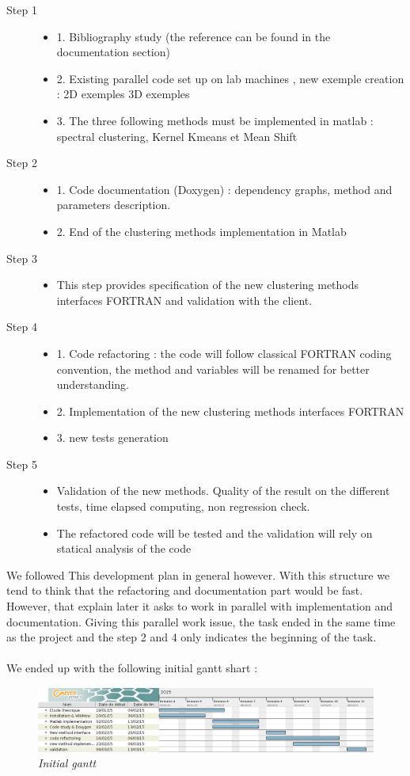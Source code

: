 \begin{description}
\item[Step 1]
	\begin{itemize}
	\item 1. Bibliography study (the reference can be found in the documentation section)
 	\item 2. Existing parallel code set up on lab machines , new exemple creation : 2D exemples 3D exemples
	\item 3. The three following methods must be implemented in matlab : spectral clustering, Kernel K­means et Mean Shift        
	\end{itemize} 
\item[Step 2]
	\begin{itemize}
	\item 1. Code documentation (Doxygen) : dependency graphs, method and parameters description.
	\item 2. End of the clustering methods implementation in Matlab
	\end{itemize}
\item[Step 3]
	\begin{itemize}
	\item This step provides specification of the new clustering methods interfaces FORTRAN and validation with the client.
	\end{itemize}
\item[Step 4]
	\begin{itemize}
	\item 1. Code refactoring : the code will follow classical FORTRAN coding convention, the method and variables will be renamed for better understanding.
	\item 2. Implementation of the new clustering methods interfaces FORTRAN
	\item 3. new tests generation
	\end{itemize}
\item[Step 5]
	\begin{itemize}
	\item Validation of the new methods. Quality of the result on the different tests, time elapsed computing, non regression check.
	\item The refactored code will be tested and the validation will rely on statical analysis of the code
	\end{itemize}
\end{description}


We followed This development plan in general however. With this structure we tend to think that the refactoring and documentation part would be fast. However, that explain later it asks to work in parallel with implementation and documentation. Giving this parallel work issue, the task ended in the same time as the project and the step 2 and 4 only indicates the beginning of the task.
 \\
 \\
 
  
 We ended up with the following initial gantt shart :
 
 \begin{figure}[h!]
\includegraphics[width=1\textwidth]{Image/gantt.png}\centering
\caption{\textit{Initial gantt}}
\end{figure}
